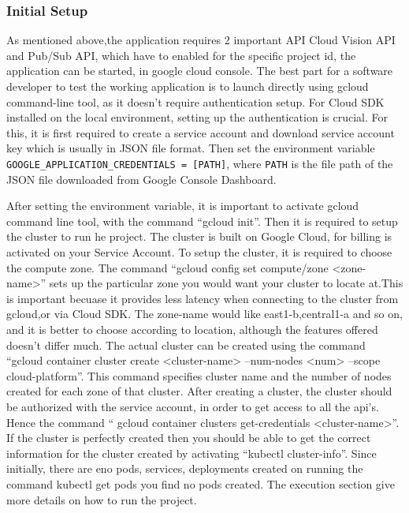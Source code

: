 \subsubsection{Initial Setup}

As mentioned above,the application requires 2 important API Cloud
Vision API and Pub/Sub API, which have to enabled for the specific
project id, the application can be started, in google cloud
console. The best part for a software developer to test the working
application is to launch directly using gcloud command-line tool, as
it doesn’t require authentication setup.  For Cloud SDK installed on
the local environment, setting up the authentication is crucial. For
this, it is first required to create a service account and download
service account key which is usually in JSON file format. Then set the
environment variable \verb|GOOGLE_APPLICATION_CREDENTIALS = [PATH]|,
where \verb|PATH| is the file path of the JSON file downloaded from
Google Console Dashboard.

After setting the environment variable, it is important to activate
gcloud command line tool, with the command ``gcloud init''. Then it is
required to setup the cluster to run he project.  The cluster is built
on Google Cloud, for billing is activated on your Service Account. To
setup the cluster, it is required to choose the compute zone. The
command ``gcloud config set compute/zone <zone-name>'' sets up the
particular zone you would want your cluster to locate at.This is
important becuase it provides less latency when connecting to the
cluster from gcloud,or via Cloud SDK. The zone-name would like
east1-b,central1-a and so on, and it is better to choose according to
location, although the features offered doesn't differ much. The
actual cluster can be created using the command ``gcloud container
cluster create <cluster-name> --num-nodes <num> --scope
cloud-platform''. This command specifies cluster name and the number
of nodes created for each zone of that cluster.  After creating a
cluster, the cluster should be authorized with the service account, in
order to get access to all the api's. Hence the command `` gcloud
container clusters get-credentials <cluster-name>''. If the cluster
is perfectly created then you should be able to get the correct
information for the cluster created by activating ``kubectl
cluster-info''. Since initially, there are eno pods, services,
deployments created on running the command kubectl get pods you find
no pods created. The execution section give more details on how to run
the project.

